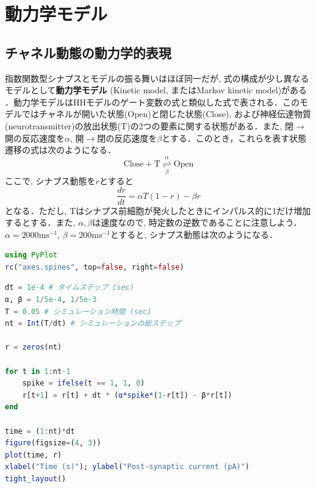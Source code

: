 \section{動力学モデル}
\subsection{チャネル動態の動力学的表現}
指数関数型シナプスとモデルの振る舞いはほぼ同一だが, 式の構成が少し異なるモデルとして\textbf{動力学モデル} (Kinetic model, またはMarkov kinetic model)がある \citep{Destexhe1994-ro}．動力学モデルはHHモデルのゲート変数の式と類似した式で表される．このモデルではチャネルが開いた状態(Open)と閉じた状態(Close), および神経伝達物質(neurotransmitter)の放出状態(T)の2つの要素に関する状態がある．また, 閉$\to$開の反応速度を$\alpha$, 開$\to$閉の反応速度を$\beta$とする．このとき，これらを表す状態遷移の式は次のようになる．
\begin{equation}
\text{Close}+\text{T}  \underset{\beta}{\overset{\alpha}{\rightleftharpoons}}\text{Open}    
\end{equation}
ここで, シナプス動態を$r$とすると
\begin{equation}
\frac{dr}{dt}=\alpha T (1-r) - \beta r
\end{equation}
となる．ただし, Tはシナプス前細胞が発火したときにインパルス的に1だけ増加するとする．また, $\alpha, \beta$は速度なので, 時定数の逆数であることに注意しよう． $\alpha=2000 \text{ms}^{-1}$, $\beta=200 \text{ms}^{-1}$とすると, シナプス動態は次のようになる．
\begin{lstlisting}[language=julia]
using PyPlot
rc("axes.spines", top=false, right=false)
\end{lstlisting}
\begin{lstlisting}[language=julia]
dt = 1e-4 # タイムステップ (sec)
α, β = 1/5e-4, 1/5e-3
T = 0.05 # シミュレーション時間 (sec)
nt = Int(T/dt) # シミュレーションの総ステップ

r = zeros(nt)

for t in 1:nt-1
    spike = ifelse(t == 1, 1, 0)
    r[t+1] = r[t] + dt * (α*spike*(1-r[t]) - β*r[t])
end

time = (1:nt)*dt
figure(figsize=(4, 3))
plot(time, r)
xlabel("Time (s)"); ylabel("Post-synaptic current (pA)")
tight_layout()
\end{lstlisting}
